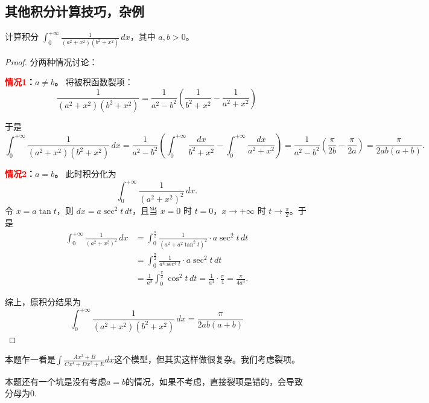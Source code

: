 \newpage

\subsection{其他积分计算技巧，杂例}

\begin{example}[（复旦2020）]
计算积分 $\displaystyle \int_{0}^{+\infty} \frac{1}{(a^2 + x^2)(b^2 + x^2)} \, dx$，其中 $a, b > 0$。
\end{example}

\begin{proof}
分两种情况讨论：

\textbf{\textcolor{red}{情况1}：$a \neq b$。}
将被积函数裂项：
\[
\frac{1}{(a^2 + x^2)(b^2 + x^2)} = \frac{1}{a^2 - b^2} \left( \frac{1}{b^2 + x^2} - \frac{1}{a^2 + x^2} \right)
\]

于是
\[
\int_{0}^{+\infty} \frac{1}{(a^2 + x^2)(b^2 + x^2)} \, dx = \frac{1}{a^2 - b^2} \left( \int_{0}^{+\infty} \frac{dx}{b^2 + x^2} - \int_{0}^{+\infty} \frac{dx}{a^2 + x^2} \right) = \frac{1}{a^2 - b^2} \left( \frac{\pi}{2b} - \frac{\pi}{2a} \right) = \frac{\pi}{2ab(a+b)}.
\]

\textbf{\textcolor{red}{情况2}：$a = b$。}
此时积分化为
\[
\int_{0}^{+\infty} \frac{1}{(a^2 + x^2)^2} \, dx.
\]
令 $x = a \tan t$，则 $dx = a \sec^2 t \, dt$，且当 $x=0$ 时 $t=0$，$x \to +\infty$ 时 $t \to \frac{\pi}{2}$。于是
\begin{align*}
\int_{0}^{+\infty} \frac{1}{(a^2 + x^2)^2} \, dx &= \int_{0}^{\frac{\pi}{2}} \frac{1}{(a^2 + a^2 \tan^2 t)^2} \cdot a \sec^2 t \, dt \\
&= \int_{0}^{\frac{\pi}{2}} \frac{1}{a^4 \sec^4 t} \cdot a \sec^2 t \, dt \\
&= \frac{1}{a^3} \int_{0}^{\frac{\pi}{2}} \cos^2 t \, dt = \frac{1}{a^3} \cdot \frac{\pi}{4} = \frac{\pi}{4a^3}.
\end{align*}

综上，原积分结果为
\[
\int_{0}^{+\infty} \frac{1}{(a^2 + x^2)(b^2 + x^2)} \, dx = \dfrac{\pi}{2ab(a+b)}
\]
\end{proof}

\begin{note}
本题乍一看是$ \int \frac{Ax^2 + B }{Cx^4 + Dx^2 + E} dx $这个模型，但其实这样做很复杂。我们考虑裂项。

本题还有一个坑是没有考虑$a=b$的情况，如果不考虑，直接裂项是错的，会导致分母为0.
\end{note}
\vspace{3mm}

